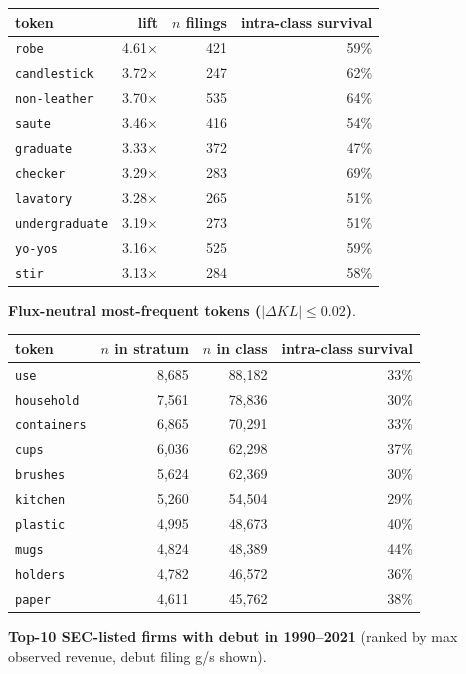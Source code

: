 \begin{tabular}{lrrr}
\toprule
token & lift & $n$ filings & intra-class survival \\
\midrule
\texttt{robe} & 4.61$\times$ & 421 & 59\% \\
\texttt{candlestick} & 3.72$\times$ & 247 & 62\% \\
\texttt{non-leather} & 3.70$\times$ & 535 & 64\% \\
\texttt{saute} & 3.46$\times$ & 416 & 54\% \\
\texttt{graduate} & 3.33$\times$ & 372 & 47\% \\
\texttt{checker} & 3.29$\times$ & 283 & 69\% \\
\texttt{lavatory} & 3.28$\times$ & 265 & 51\% \\
\texttt{undergraduate} & 3.19$\times$ & 273 & 51\% \\
\texttt{yo-yos} & 3.16$\times$ & 525 & 59\% \\
\texttt{stir} & 3.13$\times$ & 284 & 58\% \\
\bottomrule
\end{tabular}

\textbf{Flux-neutral most-frequent tokens ($|\Delta KL|\leq 0.02$)}.

\begin{tabular}{lrrr}
\toprule
token & $n$ in stratum & $n$ in class & intra-class survival \\
\midrule
\texttt{use} & 8,685 & 88,182 & 33\% \\
\texttt{household} & 7,561 & 78,836 & 30\% \\
\texttt{containers} & 6,865 & 70,291 & 33\% \\
\texttt{cups} & 6,036 & 62,298 & 37\% \\
\texttt{brushes} & 5,624 & 62,369 & 30\% \\
\texttt{kitchen} & 5,260 & 54,504 & 29\% \\
\texttt{plastic} & 4,995 & 48,673 & 40\% \\
\texttt{mugs} & 4,824 & 48,389 & 44\% \\
\texttt{holders} & 4,782 & 46,572 & 36\% \\
\texttt{paper} & 4,611 & 45,762 & 38\% \\
\bottomrule
\end{tabular}

\textbf{Top-10 SEC-listed firms with debut in 1990--2021} (ranked by max observed revenue, debut filing g/s shown).

